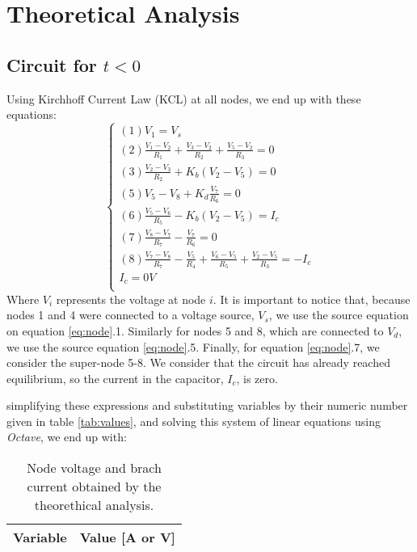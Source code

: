 \section{Theoretical Analysis}
\label{sec:analysis}

\subsection{Circuit for $t<0$}
Using Kirchhoff Current Law (KCL) at all nodes, we end up with these equations:
\begin{equation}\label{eq:node}
  \begin{cases}
    (1) V_1 = V_s \\
    (2) \frac{V_1 - V_2}{R_1} + \frac{V_3 - V_2}{R_2} + \frac{V_5 - V_2}{R_3} = 0 \\
    (3) \frac{V_2 - V_3}{R_2} + K_b(V_2 - V_5) = 0 \\
    (5) V_5 - V_8 + K_d\frac{V_7}{R_6} = 0 \\
    (6) \frac{V_5 - V_6}{R_5} - K_b(V_2-V_5) = I_c \\
    (7) \frac{V_8 - V_7}{R_7} - \frac{V_7}{R_6} = 0 \\
    (8) \frac{V_7 - V_8}{R_7} - \frac{V_5}{R_4} + \frac{V_6 - V_5}{R_5} + \frac{V_2 - V_5}{R_3} = -I_c \\
    I_c = 0V \\
  \end{cases}
\end{equation}
Where $V_i$ represents the voltage at node $i$. It is important to notice that, because nodes 1 and 4 were connected to a voltage source, $V_s$, we use the source equation on equation \ref{eq:node}.1. Similarly for nodes 5 and 8, which are connected to $V_d$, we use the source equation \ref{eq:node}.5. Finally, for equation \ref{eq:node}.7, we consider the super-node 5-8. We consider that the circuit has already reached equilibrium, so the current in the capacitor, $I_c$, is zero.
\par
simplifying these expressions and substituting variables by their numeric number given in table \ref{tab:values}, and solving this system of linear equations using \textit{Octave}, we end up with:
\begin{table}[H]
  \centering
  \begin{tabular}{|l|r|}
    \hline    
    {\bf Variable} & {\bf Value [A or V]} \\ \hline
    
  \end{tabular}
  \caption{Node voltage and brach current obtained by the theorethical analysis.}
  \label{tab:node}
\end{table}
\par

